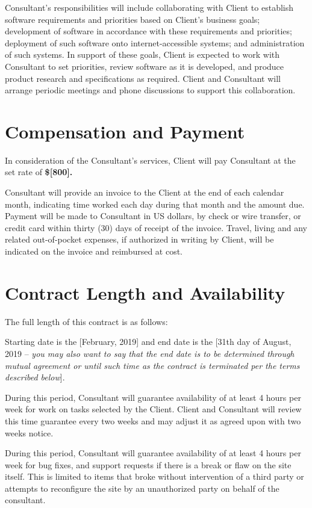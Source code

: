 \documentclass[10pt]{article}
\begin{document}
Consultant's responsibilities will include collaborating with Client to
establish software requirements and priorities based on Client's business
goals; development of software in accordance with these requirements and
priorities; deployment of such software onto internet-accessible systems;
and administration of such systems.  In support of these goals, Client is
expected to work with Consultant to set priorities, review software as it is
developed, and produce product research and specifications as required.
Client and Consultant will arrange periodic meetings and phone discussions
to support this collaboration.


\section{Compensation and Payment}

In consideration of the Consultant's services, Client will pay
Consultant at the set rate of {\bf \$[800].}

Consultant will provide an invoice to the Client at the end of each calendar
month, indicating time worked each day during that month and the
amount due.  Payment will be made to Consultant in US dollars, by check or
wire transfer, or credit card within thirty (30) days of receipt of the invoice.  Travel,
living and any related out-of-pocket expenses, if authorized in writing by
Client, will be indicated on the invoice and reimbursed at cost.


\section{Contract Length and Availability}

The full length of this contract is as follows:

Starting date is the [February, 2019] and end date is the [31th day of August, 2019 -- {\em you may also want to say that the end date is to be determined through mutual agreement or until such time as the contract is terminated per the terms described below}].

During this period, Consultant will guarantee availability of at least 4
hours per week for work on tasks selected by the Client.  Client and
Consultant will review this time guarantee every two weeks and may adjust it
as agreed upon with two weeks notice.

During this period, Consultant will guarantee availability of at least 4
hours per week for bug fixes, and support requests if there is a break or flaw on the site itself.
This is limited to items that broke without intervention of a third party or attempts to reconfigure the site
by an unauthorized party on behalf of the consultant.  
\end{document}
